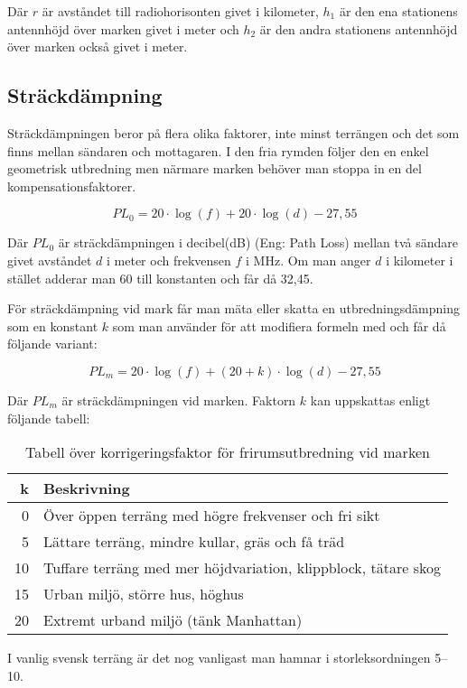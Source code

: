 Där $r$ är avståndet till radiohorisonten givet i kilometer, $h_1$ är den ena
stationens antennhöjd över marken givet i meter och $h_2$ är den andra
stationens antennhöjd över marken också givet i meter.

\subsection{Sträckdämpning}

Sträckdämpningen beror på flera olika faktorer, inte minst terrängen och det
som finns mellan sändaren och mottagaren. I den fria rymden följer den en
enkel geometrisk utbredning men närmare marken behöver man stoppa in en del
kompensationsfaktorer.

\begin{equation}
	PL_0 = 20 \cdot \log(f) + 20 \cdot \log(d) - 27,55
\end{equation}

Där $PL_{0}$ är sträckdämpningen i decibel(dB) (Eng: Path Loss) mellan två
sändare givet avståndet $d$ i meter och frekvensen $f$ i MHz. Om man anger $d$
i kilometer i stället adderar man 60 till konstanten och får då 32,45.

För sträckdämpning vid mark får man mäta eller skatta en utbredningsdämpning
som en konstant $k$ som man använder för att modifiera formeln med och får då
följande variant:


\begin{equation}
	PL_m = 20 \cdot \log(f) + (20+k) \cdot \log(d) - 27,55
\end{equation}

Där $PL_m$ är sträckdämpningen vid marken. Faktorn $k$ kan uppskattas enligt
följande tabell:

\begin{table}[h]
	\begin{centering}
		\begin{tabular}{r|l}
			\textbf{k} & \textbf{Beskrivning} \\ \hline
			0 & Över öppen terräng med högre frekvenser och fri sikt\\
			5 & Lättare terräng, mindre kullar, gräs och få träd \\
			10 & Tuffare terräng med mer höjdvariation, klippblock, tätare skog \\
			15 & Urban miljö, större hus, höghus \\
			20 & Extremt urband miljö (tänk Manhattan)\\
		\end{tabular}
	\end{centering}
	\label{tab:frirum-faktor}
	\caption{Tabell över korrigeringsfaktor för frirumsutbredning vid marken}
\end{table}

I vanlig svensk terräng är det nog vanligast man hamnar i storleksordningen
5--10.


